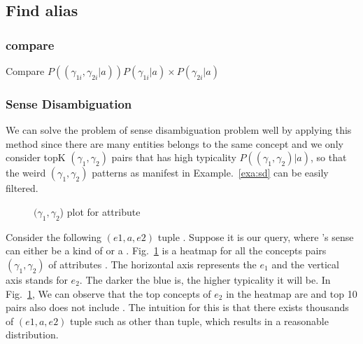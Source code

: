 


\subsection{Find alias}
\subsubsection{compare}

Compare $ P((\gamma_{1i},\gamma_{2i} |a ))P(\gamma_{1i}|a) \times P(\gamma_{2i}|a)$




\subsubsection{Sense Disambiguation}

We can solve the problem of sense disambiguation problem well by applying this method since there are many entities belongs to the same concept and we only consider topK $(\gamma_1,\gamma_2)$ pairs that has high typicality $P( (\gamma_1,\gamma_2) |a)$, so that the weird $(\gamma_1,\gamma_2)$ patterns as manifest in Example.~\ref{exa:sd} can be easily filtered.


\begin{figure}[!htb]
\centering {}
\caption{$(\gamma_1,\gamma_2$) plot for attribute } \label{fig:evplot}
\end{figure}

\begin{example}
Consider the following $(e1,a,e2)$ tuple . Suppose it is our query, where 's sense can either be a kind of  or a .
Fig.~\ref{fig:evplot} is a heatmap for all the concepts pairs $(\gamma_1,\gamma_2)$ of attributes . The horizontal axis represents the $e_1$ and the vertical axis stands for $e_2$. The darker the blue is, the higher typicality it will be. In Fig.~\ref{fig:evplot}, We can observe that the top concepts of $e_2$ in the heatmap are  and top 10 pairs also does not include . The intuition for this is that there exists thousands of $(e1,a,e2)$ tuple such as  other than  tuple, which results in a reasonable distribution.
\label{exa:sd}
\end{example}





